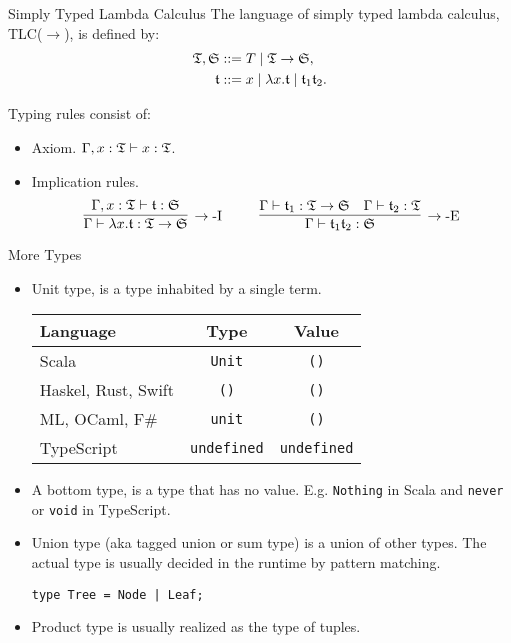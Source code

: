 \begin{frame}{Simply Typed Lambda Calculus}
    The language of simply typed lambda calculus, TLC($\rightarrow$), is defined by:
    \begin{align*}
    \mathfrak{T}, \mathfrak{S} &::= T \mid \mathfrak{T} \rightarrow \mathfrak{S}, \\
    \mathfrak{t} &::= x \mid \lambda x. \mathfrak{t} \mid \mathfrak{t}_1 \mathfrak{t}_2.
    \end{align*}
    
    Typing rules consist of:
    \begin{itemize}
        \item Axiom. $\Gamma, x : \mathfrak{T} \vdash x : \mathfrak{T}$.
        \item Implication rules.
        \[
        \infer[\rightarrow\mbox{-I}]{\Gamma \vdash \lambda x. \t : \T \rightarrow \mathfrak{S}}{\Gamma, x : \T \vdash \t : \mathfrak{S}}
        ~~~~ ~~~~
        \infer[\rightarrow\mbox{-E}]{\Gamma \vdash \t_1\t_2 : \mathfrak{S}}{
            \Gamma \vdash \t_1 : \T \rightarrow \mathfrak{S}
            &
            \Gamma \vdash \t_2 : \T
        }
        \]
    \end{itemize}
\end{frame}

\begin{frame}{More Types}
\begin{itemize}
    \item Unit type, is a type inhabited by a single term.
    \begin{tabular}{l|cc}
        Language & Type & Value \\
        \hline
        Scala & \texttt{Unit} & \texttt{()} \\
        Haskel, Rust, Swift & \texttt{()} & \texttt{()} \\
        ML, OCaml, F\# & \texttt{unit} & \texttt{()} \\
        TypeScript & \texttt{undefined} & \texttt{undefined}
    \end{tabular}
    \item A bottom type, is a type that has no value. E.g. \texttt{Nothing} in Scala and \texttt{never} or \texttt{void} in TypeScript.
    \item Union type (aka tagged union or sum type) is a union of other types. The actual type is usually decided in the runtime by pattern matching.
    
    \texttt{type Tree = Node | Leaf;}
    \item Product type is usually realized as the type of tuples.
    
\end{itemize}
\end{frame}

